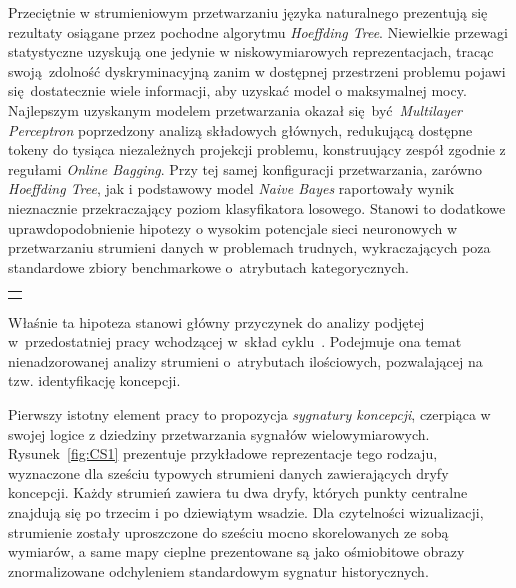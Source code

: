 Przeciętnie w strumieniowym przetwarzaniu języka naturalnego prezentują się rezultaty osiągane przez pochodne algorytmu \emph{Hoeffding Tree}. Niewielkie przewagi statystyczne uzyskują one jedynie w niskowymiarowych reprezentacjach, tracąc swoją zdolność dyskryminacyjną zanim w dostępnej przestrzeni problemu pojawi się dostatecznie wiele informacji, aby uzyskać model o maksymalnej mocy. Najlepszym uzyskanym modelem przetwarzania okazał się być \emph{Multilayer Perceptron} poprzedzony analizą składowych głównych, redukującą dostępne tokeny do tysiąca niezależnych projekcji problemu, konstruujący zespół zgodnie z regułami \emph{Online Bagging}. Przy tej samej konfiguracji przetwarzania, zarówno \emph{Hoeffding Tree}, jak i podstawowy model \emph{Naive Bayes} raportowały wynik nieznacznie przekraczający poziom klasyfikatora losowego. Stanowi to dodatkowe uprawdopodobnienie hipotezy o wysokim potencjale sieci neuronowych w przetwarzaniu strumieni danych w problemach trudnych, wykraczających poza standardowe zbiory benchmarkowe o~atrybutach kategorycznych.\vspace{1em}

{
\color{red}
\noindent\begin{tabular}{p{\textwidth}}
	\toprule &
\end{tabular}\vspace{-1em}
}
\noindent Właśnie ta hipoteza stanowi główny przyczynek do analizy podjętej w~przedostatniej pracy wchodzącej w~skład cyklu~. Podejmuje ona temat nienadzorowanej analizy strumieni o~atrybutach ilościowych, pozwalającej na tzw. identyfikację koncepcji.

Pierwszy istotny element pracy to propozycja \emph{sygnatury koncepcji}, czerpiąca w swojej logice z dziedziny przetwarzania sygnałów wielowymiarowych. Rysunek~\ref{fig:CS1} prezentuje przykładowe reprezentacje tego rodzaju, wyznaczone dla sześciu typowych strumieni danych zawierających dryfy koncepcji. Każdy strumień zawiera tu dwa dryfy, których punkty centralne znajdują się po trzecim i po dziewiątym wsadzie. Dla czytelności wizualizacji, strumienie zostały uproszczone do sześciu mocno skorelowanych ze sobą wymiarów, a same mapy cieplne prezentowane są jako ośmiobitowe obrazy znormalizowane odchyleniem standardowym sygnatur historycznych.


